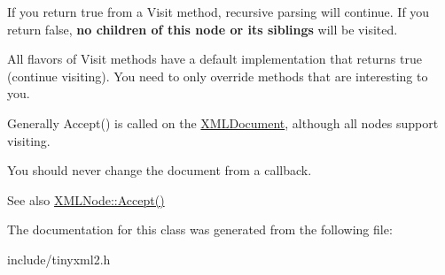 If you return \textquotesingle{}true\textquotesingle{} from a Visit method, recursive parsing will continue. If you return false, {\bfseries{no children of this node or its siblings}} will be visited.

All flavors of Visit methods have a default implementation that returns \textquotesingle{}true\textquotesingle{} (continue visiting). You need to only override methods that are interesting to you.

Generally Accept() is called on the \mbox{\hyperlink{classtinyxml2_1_1XMLDocument}{X\+M\+L\+Document}}, although all nodes support visiting.

You should never change the document from a callback.

\begin{DoxySeeAlso}{See also}
\mbox{\hyperlink{classtinyxml2_1_1XMLNode_a81e66df0a44c67a7af17f3b77a152785}{X\+M\+L\+Node\+::\+Accept()}} 
\end{DoxySeeAlso}


The documentation for this class was generated from the following file\+:\begin{DoxyCompactItemize}
\item 
include/tinyxml2.\+h\end{DoxyCompactItemize}
